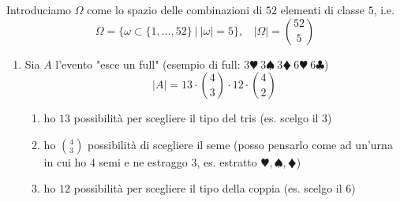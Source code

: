 Introduciamo $\Omega $ come lo spazio delle combinazioni di $52$ elementi di classe $5$, i.e.
\begin{equation*}
\Omega =\{\omega \subset \{1,\dotsc ,52\} \ |\ | \omega | =5\} ,\ \ \ \ | \Omega | =\binom{52}{5}
\end{equation*}
\begin{enumerate}
\item Sia $A$ l'evento "esce un full" (esempio di full: $3\varheartsuit \ 3\spadesuit \ 3\vardiamondsuit \ 6\varheartsuit \ 6\clubsuit $)\begin{equation*}
| A| =13\cdot \binom{4}{3} \cdot 12\cdot \binom{4}{2}
\end{equation*}
\begin{enumerate}
\item ho $13$ possibilità per scegliere il tipo del tris (es. scelgo il $3$)
\item ho $\binom{4}{3}$ possibilità di scegliere il seme (posso pensarlo come ad un'urna in cui ho $4$ semi e ne estraggo $3$, es. estratto $\varheartsuit ,\spadesuit ,\vardiamondsuit $)
\item ho $12$ possibilità per scegliere il tipo della coppia (es. scelgo il $6$)


\end{enumerate}
\end{enumerate}
